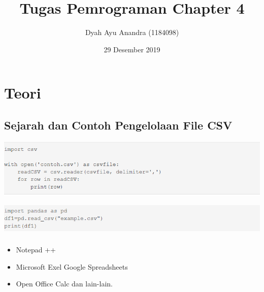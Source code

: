 \documentclass{article}
\title{Tugas Pemrograman Chapter 4}
\author{Dyah Ayu Anandra (1184098) }
\date{29 Desember 2019}
\begin{document}
\maketitle

\section{Teori}
\subsection{Sejarah dan Contoh Pengelolaan File CSV}
\usepackage{CSV kepanjangan dari Comma Separated Value merupakan salah satu tipe file yang digunakan di dalam dunia programming. Tidak hanya digunakan di dunia programming CSV pun sering digunakan dalam pengolahan informasi yang dihasilkan oleh spreadsheet untuk diproses lebih lanjut melalui mesin analitik. CSV juga dianggap sebagai file yang agnostik karena dapat digunakan oleh berbagai database untuk proses backup data. untuk pengaplikasian dalam bahasa pemrograman python buat terlebih dahulu CSV nya dengan excel kemudian akan dilakukan pemanggilan untuk data yang berada di CSV tersebut. Ada beberapa cara untuk membaca file CSV pada python:}
\begin{center}
    \includegraphics[width = 8cm\textwidth]{cs1.png}
\end{center}

\begin{center}
    \includegraphics[width = 8cm\textwidth]{cs2.png}
\end{center}

\subsubsection{}
\begin{itemize}
    \item Notepad ++
    \item Microsoft Exel 
    \iteem Google Spreadsheets
    \item  Open Office Calc dan lain-lain.
\end{itemize}
\end{document}
